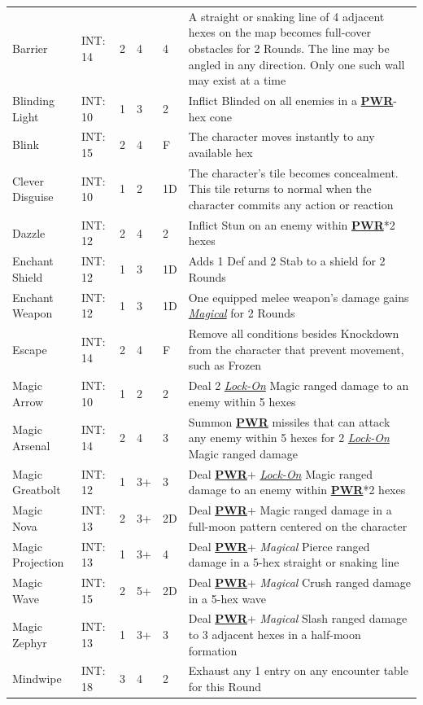 \documentclass[12pt]{article}
\newcommand{\refto}[1]{\hyperlink{#1}{\textbf{#1}}}
\newcommand{\reftoit}[1]{\hyperlink{#1}{\emph{#1}}}
\begin{document}
\begin{center}
\begin{tabularx}{\textwidth}{p{}p{}p{}p{}p{}p{}}
Barrier & INT: 14 & 2 & 4 & 4 & A straight or snaking line of 4 adjacent hexes on the map becomes full-cover obstacles for 2 Rounds. The line may be angled in any direction. Only one such wall may exist at a time\\
Blinding Light & INT: 10 & 1 & 3 & 2 & Inflict Blinded on all enemies in a \refto{PWR}-hex cone\\
Blink & INT: 15 & 2 & 4 & F & The character moves instantly to any available hex \\
Clever Disguise & INT: 10 & 1 & 2 & 1D & The character’s tile becomes concealment. This tile returns to normal when the character commits any action or reaction\\
Dazzle & INT: 12 & 2 & 4 & 2 & Inflict Stun on an enemy within \refto{PWR}*2 hexes \\
Enchant Shield & INT: 12 & 1 & 3 & 1D & Adds 1 Def and 2 Stab to a shield for 2 Rounds \\
Enchant Weapon & INT: 12 & 1 & 3 & 1D & One equipped melee weapon’s damage gains \reftoit{Magical} for 2 Rounds \\
Escape & INT: 14 & 2 & 4 & F & Remove all conditions besides Knockdown from the character that prevent movement, such as Frozen \\
Magic Arrow & INT: 10 & 1 & 2 & 2 & Deal 2 \reftoit{Lock-On} Magic ranged damage to an enemy within 5 hexes\\
Magic Arsenal & INT: 14 & 2 & 4 & 3 & Summon \refto{PWR} missiles that can attack any enemy within 5 hexes for 2 \reftoit{Lock-On} Magic ranged damage \\
Magic Greatbolt & INT: 12 & 1 & 3+ & 3 & Deal \refto{PWR}+ \reftoit{Lock-On} Magic ranged damage to an enemy within \refto{PWR}*2 hexes\\
Magic Nova & INT: 13 & 2 & 3+ & 2D & Deal \refto{PWR}+ Magic ranged damage in a full-moon pattern centered on the character\\
Magic Projection & INT: 13 & 1 & 3+ & 4 & Deal \refto{PWR}+ \emph{Magical} Pierce ranged damage in a 5-hex straight or snaking line \\
Magic Wave & INT: 15 & 2 & 5+ & 2D & Deal \refto{PWR}+ \emph{Magical} Crush ranged damage in a 5-hex wave \\
Magic Zephyr & INT: 13 & 1 & 3+ & 3 & Deal \refto{PWR}+ \emph{Magical} Slash ranged damage to 3 adjacent hexes in a half-moon formation\\
Mindwipe & INT: 18 & 3 & 4 & 2 & Exhaust any 1 entry on any encounter table for this Round\\
\hline
\end{tabularx}
\end{center}
\end{document}
